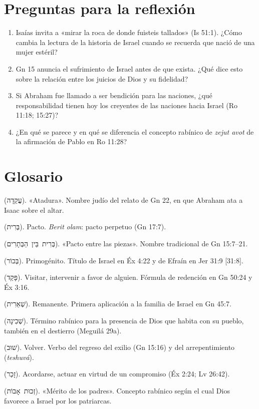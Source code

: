 \documentclass[11pt,letterpaper]{article}
\newcommand{\heb}[1]{\mbox{\foreignlanguage{hebrew}{#1}}}
\begin{document}
\section*{Preguntas para la reflexión}
\begin{enumerate}
\item Isaías invita a «mirar la roca de donde fuisteis tallados» (Is 51:1). ¿Cómo cambia la lectura de la historia de Israel cuando se recuerda que nació de una mujer estéril?
\item Gn 15 anuncia el sufrimiento de Israel antes de que exista. ¿Qué dice esto sobre la relación entre los juicios de Dios y su fidelidad?
\item Si Abraham fue llamado a ser bendición para las naciones, ¿qué responsabilidad tienen hoy los creyentes de las naciones hacia Israel (Ro 11:18; 15:27)?
\item ¿En qué se parece y en qué se diferencia el concepto rabínico de \emph{zejut avot} de la afirmación de Pablo en Ro 11:28?
\end{enumerate}

\section*{Glosario}
\begin{description}\small
\item[Akedá] (\heb{עֲקֵדָה}). «Atadura». Nombre judío del relato de Gn 22, en que Abraham ata a Isaac sobre el altar.
\item[Berit] (\heb{בְּרִית}). Pacto. \emph{Berit olam}: pacto perpetuo (Gn 17:7).
\item[Berit bein ha-betarim] (\heb{בְּרִית בֵּין הַבְּתָרִים}). «Pacto entre las piezas». Nombre tradicional de Gn 15:7–21.
\item[Bejor] (\heb{בְּכוֹר}). Primogénito. Título de Israel en Éx 4:22 y de Efraín en Jer 31:9 [31:8].
\item[Paqad] (\heb{פָּקַד}). Visitar, intervenir a favor de alguien. Fórmula de redención en Gn 50:24 y Éx 3:16.
\item[She'erit] (\heb{שְׁאֵרִית}). Remanente. Primera aplicación a la familia de Israel en Gn 45:7.
\item[Shejiná] (\heb{שְׁכִינָה}). Término rabínico para la presencia de Dios que habita con su pueblo, también en el destierro (Meguilá 29a).
\item[Shuv] (\heb{שׁוּב}). Volver. Verbo del regreso del exilio (Gn 15:16) y del arrepentimiento (\emph{teshuvá}).
\item[Zajar] (\heb{זָכַר}). Acordarse, actuar en virtud de un compromiso (Éx 2:24; Lv 26:42).
\item[Zejut avot] (\heb{זְכוּת אָבוֹת}). «Mérito de los padres». Concepto rabínico según el cual Dios favorece a Israel por los patriarcas.
\end{description}
\end{document}
